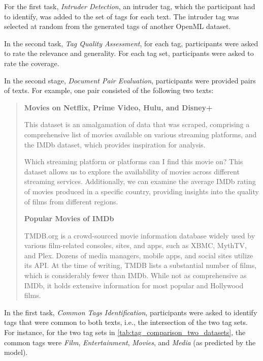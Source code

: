 For the first task, \textit{Intruder Detection}, an intruder tag, which the participant had to identify, was added to the set of tags for each text. The intruder tag was selected at random from the generated tags of another OpenML dataset.

In the second task, \textit{Tag Quality Assessment}, for each tag, participants were asked to rate the relevance and generality. For each tag set, participants were asked to rate the coverage.

In the second stage, \textit{Document Pair Evaluation}, participants were provided pairs of texts. For example, one pair consisted of the following two texts:

\begin{quote}
    \textbf{Movies on Netflix, Prime Video, Hulu, and Disney+}

    This dataset is an amalgamation of data that was scraped, comprising a comprehensive list of movies available on various streaming platforms, and the IMDb dataset, which provides inspiration for analysis.

    Which streaming platform or platforms can I find this movie on? This dataset allows us to explore the availability of movies across different streaming services. Additionally, we can examine the average IMDb rating of movies produced in a specific country, providing insights into the quality of films from different regions.

    \textbf{Popular Movies of IMDb}

    TMDB.org is a crowd-sourced movie information database widely used by various film-related consoles, sites, and apps, such as XBMC, MythTV, and Plex. Dozens of media managers, mobile apps, and social sites utilize its API. At the time of writing, TMDB lists a substantial number of films, which is considerably fewer than IMDb. While not as comprehensive as IMDb, it holds extensive information for most popular and Hollywood films.
\end{quote}

In the first task, \textit{Common Tags Identification}, participants were asked to identify tags that were common to both texts, i.e., the intersection of the two tag sets. For instance, for the two tag sets in \cref{tab:tag_comparison_two_datasets}, the common tags were \textit{Film}, \textit{Entertainment}, \textit{Movies}, and \textit{Media} (as predicted by the model).

